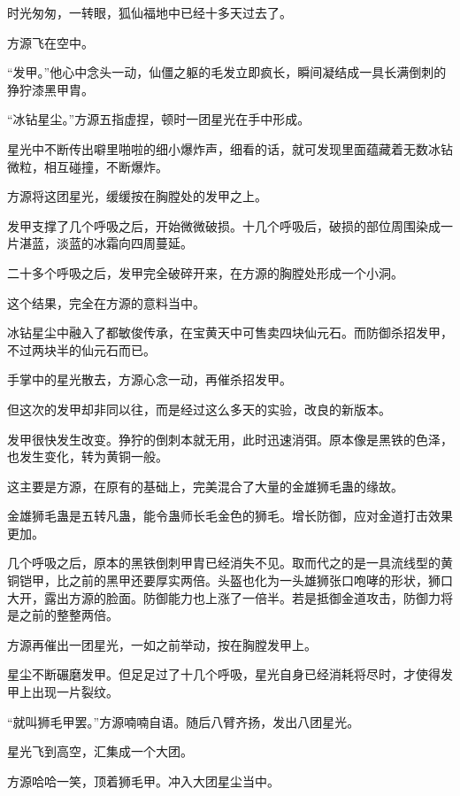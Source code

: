 
\begin{this_body}

时光匆匆，一转眼，狐仙福地中已经十多天过去了。

方源飞在空中。

“发甲。”他心中念头一动，仙僵之躯的毛发立即疯长，瞬间凝结成一具长满倒刺的狰狞漆黑甲胄。

“冰钻星尘。”方源五指虚捏，顿时一团星光在手中形成。

星光中不断传出噼里啪啦的细小爆炸声，细看的话，就可发现里面蕴藏着无数冰钻微粒，相互碰撞，不断爆炸。

方源将这团星光，缓缓按在胸膛处的发甲之上。

发甲支撑了几个呼吸之后，开始微微破损。十几个呼吸后，破损的部位周围染成一片湛蓝，淡蓝的冰霜向四周蔓延。

二十多个呼吸之后，发甲完全破碎开来，在方源的胸膛处形成一个小洞。

这个结果，完全在方源的意料当中。

冰钻星尘中融入了都敏俊传承，在宝黄天中可售卖四块仙元石。而防御杀招发甲，不过两块半的仙元石而已。

手掌中的星光散去，方源心念一动，再催杀招发甲。

但这次的发甲却非同以往，而是经过这么多天的实验，改良的新版本。

发甲很快发生改变。狰狞的倒刺本就无用，此时迅速消弭。原本像是黑铁的色泽，也发生变化，转为黄铜一般。

这主要是方源，在原有的基础上，完美混合了大量的金雄狮毛蛊的缘故。

金雄狮毛蛊是五转凡蛊，能令蛊师长毛金色的狮毛。增长防御，应对金道打击效果更加。

几个呼吸之后，原本的黑铁倒刺甲胄已经消失不见。取而代之的是一具流线型的黄铜铠甲，比之前的黑甲还要厚实两倍。头盔也化为一头雄狮张口咆哮的形状，狮口大开，露出方源的脸面。防御能力也上涨了一倍半。若是抵御金道攻击，防御力将是之前的整整两倍。

方源再催出一团星光，一如之前举动，按在胸膛发甲上。

星尘不断碾磨发甲。但足足过了十几个呼吸，星光自身已经消耗将尽时，才使得发甲上出现一片裂纹。

“就叫狮毛甲罢。”方源喃喃自语。随后八臂齐扬，发出八团星光。

星光飞到高空，汇集成一个大团。

方源哈哈一笑，顶着狮毛甲。冲入大团星尘当中。


\end{this_body}
